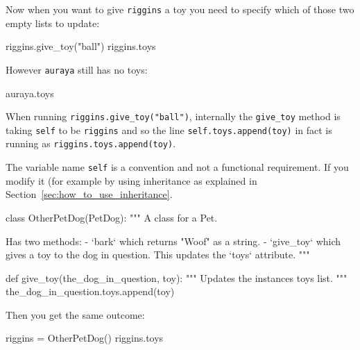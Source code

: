 Now when you want to give \texttt{riggins} a toy you need to specify which of those two
empty lists to update:




\begin{pyin}
riggins.give_toy("ball")
riggins.toys
\end{pyin}





\begin{raw}
['ball']
\end{raw}

However \texttt{auraya} still has no toys:

\begin{pyin}
auraya.toys
\end{pyin}





\begin{raw}
[]
\end{raw}





When running \texttt{riggins.give\_toy("ball")}, internally the \texttt{give\_toy} method is
taking \texttt{self} to be \texttt{riggins} and so the
line \texttt{self.toys.append(toy)} in fact is running as \texttt{riggins.toys.append(toy)}.


The variable name \texttt{self} is a convention and not a functional requirement.
If you modify it
(for example by using inheritance as explained in
Section~\ref{sec:how_to_use_inheritance}.




\begin{pyin}
class OtherPetDog(PetDog):
    """
    A class for a Pet.

    Has two methods:
        - `bark` which returns "Woof" as a string.
        - `give_toy` which gives a toy to the dog in question. This updates the
          `toys` attribute.
    """

    def give_toy(the_dog_in_question, toy):
        """
        Updates the instances toys list.
        """
        the_dog_in_question.toys.append(toy)
\end{pyin}





Then you get the same outcome:




\begin{pyin}
riggins = OtherPetDog()
riggins.toys
\end{pyin}





